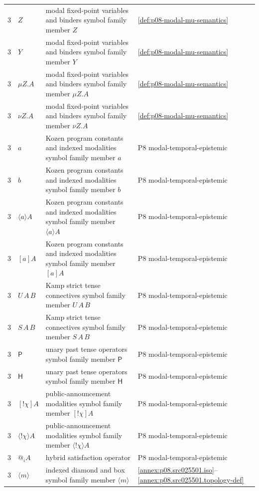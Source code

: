 \begin{longtable}{@{}p{}p{}p{}p{}@{}}
3 & \(Z\) & modal fixed-point variables and binders symbol family member \(Z\) & \hyperref[def:p08-modal-mu-semantics]{\ref*{def:p08-modal-mu-semantics}} \\
3 & \(Y\) & modal fixed-point variables and binders symbol family member \(Y\) & \hyperref[def:p08-modal-mu-semantics]{\ref*{def:p08-modal-mu-semantics}} \\
3 & \(\mu Z.A\) & modal fixed-point variables and binders symbol family member \(\mu Z.A\) & \hyperref[def:p08-modal-mu-semantics]{\ref*{def:p08-modal-mu-semantics}} \\
3 & \(\nu Z.A\) & modal fixed-point variables and binders symbol family member \(\nu Z.A\) & \hyperref[def:p08-modal-mu-semantics]{\ref*{def:p08-modal-mu-semantics}} \\
3 & \(a\) & Kozen program constants and indexed modalities symbol family member \(a\) & P8 modal-temporal-epistemic \\
3 & \(b\) & Kozen program constants and indexed modalities symbol family member \(b\) & P8 modal-temporal-epistemic \\
3 & \(\langle a\rangle A\) & Kozen program constants and indexed modalities symbol family member \(\langle a\rangle A\) & P8 modal-temporal-epistemic \\
3 & \([a]A\) & Kozen program constants and indexed modalities symbol family member \([a]A\) & P8 modal-temporal-epistemic \\
3 & \(U\,A\,B\) & Kamp strict tense connectives symbol family member \(U\,A\,B\) & P8 modal-temporal-epistemic \\
3 & \(S\,A\,B\) & Kamp strict tense connectives symbol family member \(S\,A\,B\) & P8 modal-temporal-epistemic \\
3 & \(\mathsf P\) & unary past tense operators symbol family member \(\mathsf P\) & P8 modal-temporal-epistemic \\
3 & \(\mathsf H\) & unary past tense operators symbol family member \(\mathsf H\) & P8 modal-temporal-epistemic \\
3 & \([!\chi]A\) & public-announcement modalities symbol family member \([!\chi]A\) & P8 modal-temporal-epistemic \\
3 & \(\langle!\chi\rangle A\) & public-announcement modalities symbol family member \(\langle!\chi\rangle A\) & P8 modal-temporal-epistemic \\
3 & \(@_iA\) & hybrid satisfaction operator & P8 modal-temporal-epistemic \\
3 & \(\langle m\rangle\) & indexed diamond and box symbol family member \(\langle m\rangle\) & \hyperref[annex:p08.src025501.iso]{\ref*{annex:p08.src025501.iso}}--\hyperref[annex:p08.src025501.topology-def]{\ref*{annex:p08.src025501.topology-def}} \\

\end{longtable}
